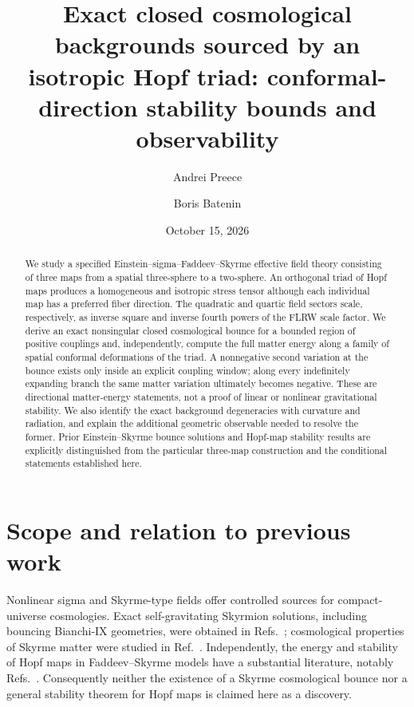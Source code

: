 \documentclass[aps,prd,reprint,longbibliography,nofootinbib,superscriptaddress]{revtex4-2}
\begin{document}
\title{Exact closed cosmological backgrounds sourced by an isotropic Hopf triad: conformal-direction stability bounds and observability}
\author{Andrei Preece}
\author{Boris Batenin}
\date{October 15, 2026}
\begin{abstract}
We study a specified Einstein--sigma--Faddeev--Skyrme effective field theory consisting of three maps from a spatial three-sphere to a two-sphere. An orthogonal triad of Hopf maps produces a homogeneous and isotropic stress tensor although each individual map has a preferred fiber direction. The quadratic and quartic field sectors scale, respectively, as inverse square and inverse fourth powers of the FLRW scale factor. We derive an exact nonsingular closed cosmological bounce for a bounded region of positive couplings and, independently, compute the full matter energy along a family of spatial conformal deformations of the triad. A nonnegative second variation at the bounce exists only inside an explicit coupling window; along every indefinitely expanding branch the same matter variation ultimately becomes negative. These are directional matter-energy statements, not a proof of linear or nonlinear gravitational stability. We also identify the exact background degeneracies with curvature and radiation, and explain the additional geometric observable needed to resolve the former. Prior Einstein--Skyrme bounce solutions and Hopf-map stability results are explicitly distinguished from the particular three-map construction and the conditional statements established here.
\end{abstract}
\maketitle

\section{Scope and relation to previous work}
Nonlinear sigma and Skyrme-type fields offer controlled sources for compact-universe cosmologies. Exact self-gravitating Skyrmion solutions, including bouncing Bianchi-IX geometries, were obtained in Refs.~\cite{AyonBeato2016,Canfora2019}; cosmological properties of Skyrme matter were studied in Ref.~\cite{Canfora2014}. Independently, the energy and stability of Hopf maps in Faddeev--Skyrme models have a substantial literature, notably Refs.~\cite{Ward1999,Speight2007,Guerra2026}. Consequently neither the existence of a Skyrme cosmological bounce nor a general stability theorem for Hopf maps is claimed here as a discovery.
\end{document}
